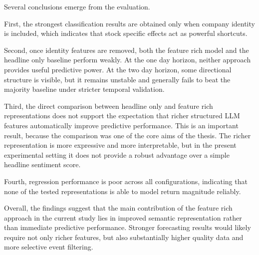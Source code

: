 Several conclusions emerge from the evaluation.

First, the strongest classification results are obtained only when company identity is included, which indicates that stock specific effects act as powerful shortcuts.

Second, once identity features are removed, both the feature rich model and the headline only baseline perform weakly. At the one day horizon, neither approach provides useful predictive power. At the two day horizon, some directional structure is visible, but it remains unstable and generally fails to beat the majority baseline under stricter temporal validation.

Third, the direct comparison between headline only and feature rich representations does not support the expectation that richer structured LLM features automatically improve predictive performance. This is an important result, because the comparison was one of the core aims of the thesis. The richer representation is more expressive and more interpretable, but in the present experimental setting it does not provide a robust advantage over a simple headline sentiment score.

Fourth, regression performance is poor across all configurations, indicating that none of the tested representations is able to model return magnitude reliably.

Overall, the findings suggest that the main contribution of the feature rich approach in the current study lies in improved semantic representation rather than immediate predictive performance. Stronger forecasting results would likely require not only richer features, but also substantially higher quality data and more selective event filtering.